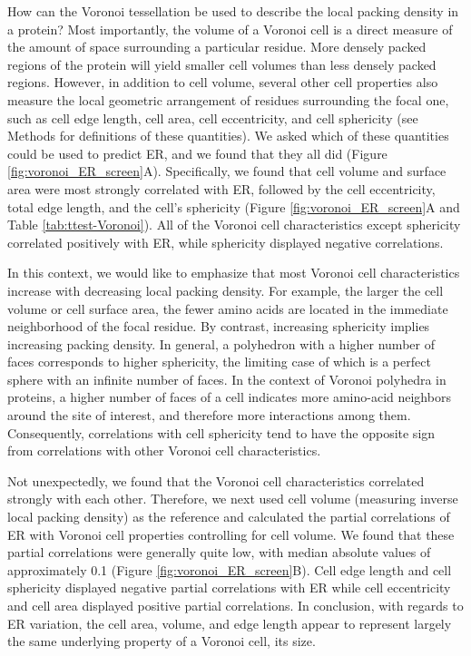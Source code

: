 \documentclass[12pt]{article}
\begin{document}
How can the Voronoi tessellation be used to describe the local packing density in a protein? Most importantly, the volume of a Voronoi cell is a direct measure of the amount of space surrounding a particular residue. More densely packed regions of the protein will yield smaller cell volumes than less densely packed regions. However, in addition to cell volume, several other cell properties also measure the local geometric arrangement of residues surrounding the focal one, such as cell edge length, cell area, cell eccentricity, and cell sphericity (see Methods for definitions of these quantities). We asked which of these quantities could be used to predict ER, and we found that they all did (Figure \ref{fig:voronoi_ER_screen}A). Specifically, we found that cell volume and surface area were most strongly correlated with ER, followed by the cell eccentricity, total edge length, and the cell's sphericity (Figure \ref{fig:voronoi_ER_screen}A and Table \ref{tab:ttest-Voronoi}). All of the Voronoi cell characteristics except sphericity correlated positively with ER, while sphericity displayed negative correlations.

In this context, we would like to emphasize that most Voronoi cell characteristics increase with decreasing local packing density. For example, the larger the cell volume or cell surface area, the fewer amino acids are located in the immediate neighborhood of the focal residue. By contrast, increasing sphericity implies increasing packing density. In general, a polyhedron with a higher number of faces corresponds to higher sphericity, the limiting case of which is a perfect sphere with an infinite number of faces. In the context of Voronoi polyhedra in proteins, a higher number of faces of a cell indicates more amino-acid neighbors around the site of interest, and therefore more interactions among them. Consequently, correlations with cell sphericity tend to have the opposite sign from correlations with other Voronoi cell characteristics.

Not unexpectedly, we found that the Voronoi cell characteristics correlated strongly with each other. Therefore, we next used cell volume (measuring inverse local packing density) as the reference and calculated the partial correlations of ER with Voronoi cell properties controlling for cell volume. We found that these partial correlations were generally quite low, with median absolute values of approximately 0.1  (Figure \ref{fig:voronoi_ER_screen}B). Cell edge length and cell sphericity displayed negative partial correlations with ER while cell eccentricity and cell area displayed positive partial correlations. In conclusion, with regards to ER variation, the cell area, volume, and edge length appear to represent largely the same underlying property of a Voronoi cell, its size.
\end{document}
